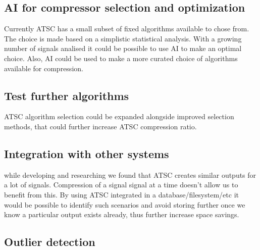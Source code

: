\documentclass[conference]{IEEEtran}
\begin{document}
\subsection{AI for compressor selection and optimization}

Currently ATSC has a small subset of fixed algorithms available to chose from. The choice is made based on a simplistic statistical analysis. With a growing number of signals analised it could be possible to use AI to make an optimal choice. 
Also, AI could be used to make a more curated choice of algorithms available for compression.


\subsection*{Test further algorithms}

ATSC algorithm selection could be expanded alongside improved selection methods, that could further increase ATSC compression ratio.


\subsection{Integration with other systems}

while developing and researching we found that ATSC creates similar outputs for a lot of signals. Compression of a signal signal at a time doesn't allow us to benefit from this. By using ATSC integrated in a database/filesystem/etc it would be possible
to identify such scenarios and avoid storing further once we know a particular output exists already, thus further increase space savings.


\subsection{Outlier detection}
\end{document}

